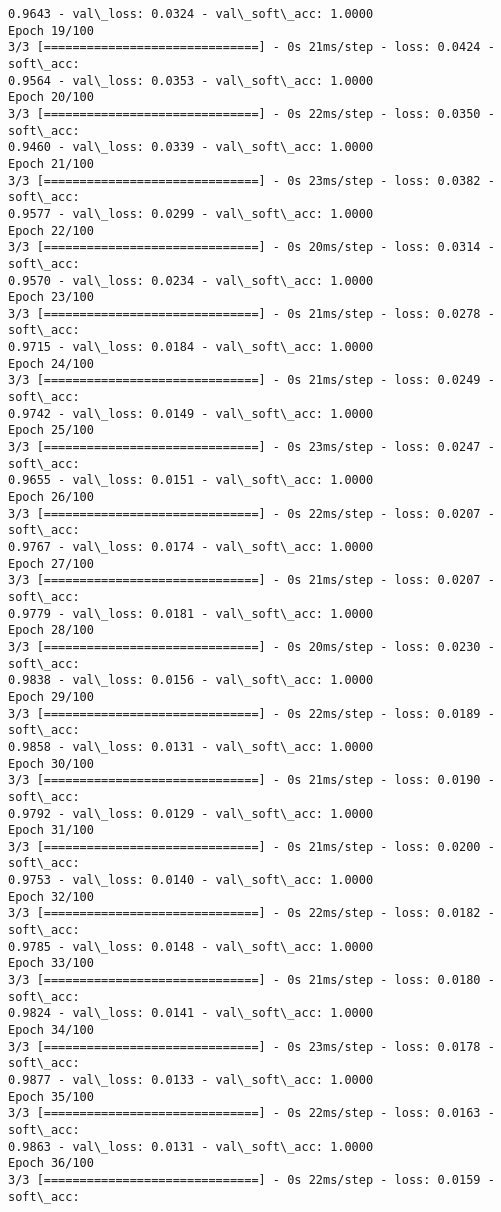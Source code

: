 \documentclass[11pt]{article}
\begin{document}
\begin{Verbatim}[commandchars=\\\{\}]
0.9643 - val\_loss: 0.0324 - val\_soft\_acc: 1.0000
Epoch 19/100
3/3 [==============================] - 0s 21ms/step - loss: 0.0424 - soft\_acc:
0.9564 - val\_loss: 0.0353 - val\_soft\_acc: 1.0000
Epoch 20/100
3/3 [==============================] - 0s 22ms/step - loss: 0.0350 - soft\_acc:
0.9460 - val\_loss: 0.0339 - val\_soft\_acc: 1.0000
Epoch 21/100
3/3 [==============================] - 0s 23ms/step - loss: 0.0382 - soft\_acc:
0.9577 - val\_loss: 0.0299 - val\_soft\_acc: 1.0000
Epoch 22/100
3/3 [==============================] - 0s 20ms/step - loss: 0.0314 - soft\_acc:
0.9570 - val\_loss: 0.0234 - val\_soft\_acc: 1.0000
Epoch 23/100
3/3 [==============================] - 0s 21ms/step - loss: 0.0278 - soft\_acc:
0.9715 - val\_loss: 0.0184 - val\_soft\_acc: 1.0000
Epoch 24/100
3/3 [==============================] - 0s 21ms/step - loss: 0.0249 - soft\_acc:
0.9742 - val\_loss: 0.0149 - val\_soft\_acc: 1.0000
Epoch 25/100
3/3 [==============================] - 0s 23ms/step - loss: 0.0247 - soft\_acc:
0.9655 - val\_loss: 0.0151 - val\_soft\_acc: 1.0000
Epoch 26/100
3/3 [==============================] - 0s 22ms/step - loss: 0.0207 - soft\_acc:
0.9767 - val\_loss: 0.0174 - val\_soft\_acc: 1.0000
Epoch 27/100
3/3 [==============================] - 0s 21ms/step - loss: 0.0207 - soft\_acc:
0.9779 - val\_loss: 0.0181 - val\_soft\_acc: 1.0000
Epoch 28/100
3/3 [==============================] - 0s 20ms/step - loss: 0.0230 - soft\_acc:
0.9838 - val\_loss: 0.0156 - val\_soft\_acc: 1.0000
Epoch 29/100
3/3 [==============================] - 0s 22ms/step - loss: 0.0189 - soft\_acc:
0.9858 - val\_loss: 0.0131 - val\_soft\_acc: 1.0000
Epoch 30/100
3/3 [==============================] - 0s 21ms/step - loss: 0.0190 - soft\_acc:
0.9792 - val\_loss: 0.0129 - val\_soft\_acc: 1.0000
Epoch 31/100
3/3 [==============================] - 0s 21ms/step - loss: 0.0200 - soft\_acc:
0.9753 - val\_loss: 0.0140 - val\_soft\_acc: 1.0000
Epoch 32/100
3/3 [==============================] - 0s 22ms/step - loss: 0.0182 - soft\_acc:
0.9785 - val\_loss: 0.0148 - val\_soft\_acc: 1.0000
Epoch 33/100
3/3 [==============================] - 0s 21ms/step - loss: 0.0180 - soft\_acc:
0.9824 - val\_loss: 0.0141 - val\_soft\_acc: 1.0000
Epoch 34/100
3/3 [==============================] - 0s 23ms/step - loss: 0.0178 - soft\_acc:
0.9877 - val\_loss: 0.0133 - val\_soft\_acc: 1.0000
Epoch 35/100
3/3 [==============================] - 0s 22ms/step - loss: 0.0163 - soft\_acc:
0.9863 - val\_loss: 0.0131 - val\_soft\_acc: 1.0000
Epoch 36/100
3/3 [==============================] - 0s 22ms/step - loss: 0.0159 - soft\_acc:

\end{Verbatim}
\end{document}
